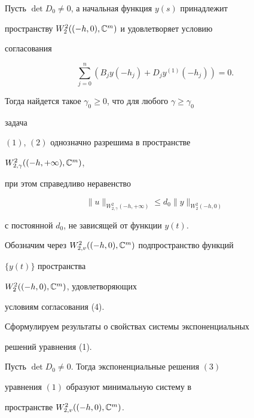 \begin{lem} 


Пусть $\det D_0\ne0$, а начальная функция $y(s)$ принадлежит 


пространству $W^{2}_{2}((-h,0),\Bbb C^m)$ и удовлетворяет условию 


согласования 


\begin{equation} 


\sum^n_{j=0}(B_j y(-h_j)+D_j y^{(1)}(-h_j))=0. 


\end{equation} 


 


Тогда найдется такое $\gamma_0\ge0$, что для любого $\gamma\ge\gamma_0$ 


задача 


$(1)$, $(2)$ однозначно разрешима в пространстве 


$W^{2}_{2,\gamma}((-h,+\infty),\Bbb C^m)$, 


при этом справедливо неравенство 


\begin{equation} 


\|u\|_{W^{2}_{2,\gamma}(-h,+\infty)}\le d_0 


\|y\|_{W^{2}_{2}(-h,0)} 


\end{equation} 


с постоянной $d_0$, не зависящей от функции $y(t)$. 


\end{lem} 


 


Обозначим через $W^{2}_{2,v}((-h,0),\Bbb C^m)$ подпространство функций 


$\{y(t)\}$ пространства\linebreak


$W^{2}_{2}((-h,0),\Bbb C^m)$, удовлетворяющих 


условиям согласования (4). 


 


Сформулируем результаты о свойствах системы экспоненциальных 


решений уравнения (1). 


 


\begin{prop} 


Пусть $\det D_0\ne0$. Тогда экспоненциальные решения $(3)$ 


уравнения $(1)$ образуют минимальную систему в 


пространстве $W^{2}_{2,v}((-h,0),\Bbb C^m)$. 


\end{prop} 


